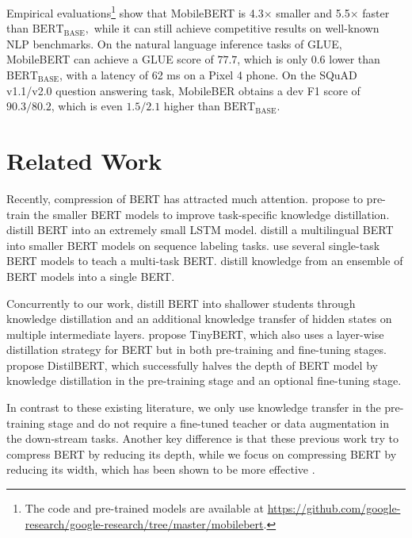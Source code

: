\documentclass[11pt,a4paper]{article}
\begin{document}
Empirical evaluations\footnote{The code and pre-trained models are available at \url{https://github.com/google-research/google-research/tree/master/mobilebert}.} show that MobileBERT is 4.3$\times$ smaller and 5.5$\times$ faster than  $\text{BERT}_\text{BASE}, $ while it can still achieve competitive results on well-known NLP benchmarks.
On the natural language inference tasks of GLUE, MobileBERT can achieve a GLUE score of $77.7$, which is only $0.6$ lower than $\text{BERT}_\text{BASE}$, with a  latency of 62 ms on a Pixel 4 phone. On the SQuAD v1.1/v2.0 question answering task, MobileBER  obtains a dev F1 score  of $90.3/80.2$,   which is even $1.5/2.1$ higher than $\text{BERT}_\text{BASE}$.














\section{Related Work}



Recently, compression of BERT has attracted much attention. \citet{turc2019well} propose to pre-train the smaller BERT models to improve task-specific knowledge distillation. \citet{tang2019distilling} distill BERT into an extremely small LSTM model. \citet{tsai2019small} distill a multilingual BERT into smaller BERT models on sequence labeling tasks.
\citet{clark2019bam} use several single-task BERT models to teach a multi-task BERT. \citet{liu2019multi} distill knowledge from an ensemble of BERT models into a single BERT.

Concurrently to our work, \citet{sun2019patient} distill BERT into shallower students through knowledge distillation and an additional knowledge transfer of hidden states on multiple intermediate layers. \citet{jiao2019tinybert} propose TinyBERT, which also uses a layer-wise distillation strategy for BERT but in both pre-training and fine-tuning stages. \citet{sanh2019distilbert} propose DistilBERT, which successfully halves the depth of BERT model by knowledge distillation in the pre-training stage and an optional fine-tuning stage.


In contrast to these existing literature, we only use knowledge transfer in the pre-training stage and do not require a fine-tuned teacher or data augmentation \cite{wu2019conditional} in the down-stream tasks. Another key difference is that these previous work try to compress BERT by reducing its depth, while we focus on compressing BERT by reducing its width, which has been shown to be more effective \cite{turc2019well}. 
\end{document}
